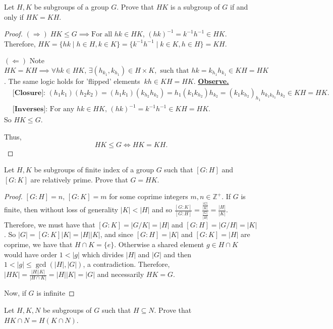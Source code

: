 \documentclass[addpoints,10pt]{exam}
\theoremstyle{plain}
\theoremstyle{definition}
\newtheorem{prob}[thm]{Problem}
\theoremstyle{plain}
\theoremstyle{plain}
\theoremstyle{definition}
\let\oldprob\prob
\let\endoldprob\endprob
\renewenvironment{prob}
  {\begin{singlespace}\oldprob}
  {\endoldprob\end{singlespace}}
\newcommand{\belowtitle}{\leavevmode\newline}
\newcommand{\Observe}{\underline{\textbf{Observe.}}}
\newcommand{\IF}{\mathbf{(\Rightarrow)}}
\newcommand{\FI}{\mathbf{(\Leftarrow)}}
\newcommand{\ZZ}{\ensuremath{\mathbb{Z}}}
\begin{document}
\begin{prob}
Let $H,K$ be subgroups of a group $G$. Prove that $HK$ is a subgroup of $G$ if and only if $HK=KH$.
\end{prob}

\begin{proof}\belowtitle
  $\IF\;HK\leq G\implies\text{For all }hk\in HK$, $(hk)^{-1}=k^{-1}h^{-1}\in HK$. Therefore, $HK=\{hk\mid h\in H, k\in K\}=\{k^{-1}h^{-1}\mid k\in K,h\in H\}=KH$.

  $\FI$ Note $HK=KH\implies \forall hk\in HK,\,\exists (h_{k_{1}},k_{h_{1}})\in H\times K, \text{ such that }hk=k_{h_{1}}h_{k_{1}}\in KH=HK$. The same logic holds for 'flipped' elements$\;\;kh\in KH=HK$. \Observe
  \begin{align*}
    &\textbf{[Closure]: } (h_{1}k_{1})(h_{2}k_{2})=(h_{1}k_{1})(k_{h_{2}}h_{k_{2}})=h_{1}(k_{1}k_{h_{2}})h_{k_{2}}=(k_{1}k_{h_{2}})_{h_{1}}h_{k_{1}k_{h_{2}}}h_{k_{2}}\in KH=HK.\\
    &\textbf{[Inverses]: }\text{For any }hk\in HK,\,(hk)^{-1}=k^{-1}h^{-1}\in KH=HK.
  \end{align*}
  So $HK\leq G$.

  Thus,
  $$HK\leq G\iff HK=KH.$$
\end{proof}
\newpage
\begin{prob}
Let $H,K$ be subgroups of finite index of a group $G$ such that $[G:H]$ and $[G:K]$ are relatively prime. Prove that $G=HK$.
\end{prob}

\begin{proof}
$[G:H]=n,\,[G:K]=m$ for some coprime integers $m,n\in \ZZ^{+}$. If $G$ is finite, then without loss of generality $|K|<|H|$ and so $\frac{[G:K]}{[G:H]}=\frac{\frac{|G|}{|K|}}{\frac{|G|}{|H|}}=\frac{|H|}{|K|}$. Therefore, we must have that $[G:K]=|G/K|=|H|$ and $[G:H]=|G/H|=|K|$. So $|G|=[G:K]|K|=|H||K|$, and since $[G:H]=|K|$ and $[G:K]=|H|$ are coprime, we have that $H\cap K=\{e\}$. Otherwise a shared element $g\in H\cap K$ would have order $1<|g|$ which divides $|H|$ and $|G|$ and then $1<|g|\leq \gcd(|H|,|G|)$, a contradiction. Therefore, $|HK|=\frac{|H||K|}{|H\cap K|}=|H||K|=|G|$ and necessarily $HK=G$.

Now, if $G$ is infinite
\end{proof}

\begin{prob}
Let $H,K,N$ be subgroups of $G$ such that $H\subseteq N$. Prove that $HK\cap N = H(K\cap N)$.
\end{prob}
\end{document}
